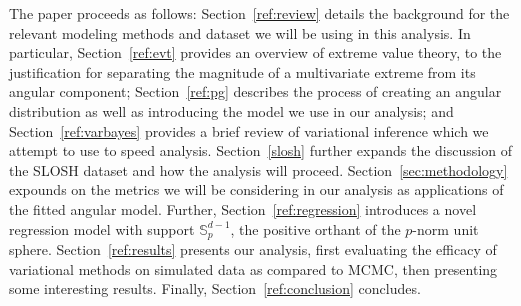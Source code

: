 
The paper proceeds as follows:  Section~\ref{ref:review} details the background 
    for the relevant modeling methods and dataset we will be using in this analysis.  
    In particular, Section~\ref{ref:evt} provides an overview of extreme value 
    theory, to the justification for separating the magnitude of a multivariate 
    extreme from its angular component; Section~\ref{ref:pg} describes the process 
    of creating an angular distribution as well as introducing the model we use in 
    our analysis; and Section~\ref{ref:varbayes} provides a brief review of variational
    inference which we attempt to use to speed analysis.  Section~\ref{slosh} further
    expands the discussion of the SLOSH dataset and how the analysis will proceed.
    Section~\ref{sec:methodology} expounds on the metrics we will be considering in
    our analysis as applications of the fitted angular model.  Further, 
    Section~\ref{ref:regression} introduces a novel regression model with support
    $\mathbb{S}_{p}^{d-1}$, the positive orthant of the $p$-norm unit sphere.
    Section~\ref{ref:results} presents our analysis, first evaluating the efficacy of
    variational methods on simulated data as compared to MCMC, then
    presenting some interesting results. Finally, Section~\ref{ref:conclusion} 
    concludes.

